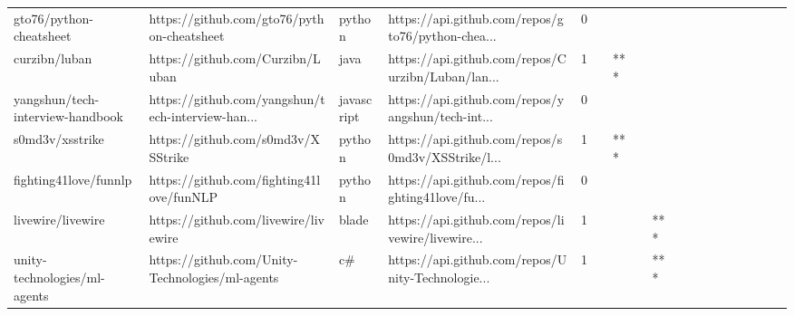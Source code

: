 \begin{tabular}{llllrlllllllllllll}
gto76/python-cheatsheet                            &         https://github.com/gto76/python-cheatsheet &            python &  https://api.github.com/repos/gto76/python-chea... &       0 &         &        &           &                &                 &        &           &           &          &          &       &              &          \\
curzibn/luban                                      &                   https://github.com/Curzibn/Luban &              java &  https://api.github.com/repos/Curzibn/Luban/lan... &       1 &         &    *** &           &                &                 &        &           &           &          &          &       &              &          \\
yangshun/tech-interview-handbook                   &  https://github.com/yangshun/tech-interview-han... &        javascript &  https://api.github.com/repos/yangshun/tech-int... &       0 &         &        &           &                &                 &        &           &           &          &          &       &              &          \\
s0md3v/xsstrike                                    &                 https://github.com/s0md3v/XSStrike &            python &  https://api.github.com/repos/s0md3v/XSStrike/l... &       1 &         &    *** &           &                &                 &        &           &           &          &          &       &              &          \\
fighting41love/funnlp                              &           https://github.com/fighting41love/funNLP &            python &  https://api.github.com/repos/fighting41love/fu... &       0 &         &        &           &                &                 &        &           &           &          &          &       &              &          \\
livewire/livewire                                  &               https://github.com/livewire/livewire &             blade &  https://api.github.com/repos/livewire/livewire... &       1 &         &        &           &            *** &                 &        &           &           &          &          &       &              &          \\
unity-technologies/ml-agents                       &    https://github.com/Unity-Technologies/ml-agents &                c\# &  https://api.github.com/repos/Unity-Technologie... &       1 &         &        &           &            *** &                 &        &           &           &          &          &       &              &          \\

\end{tabular}
